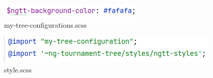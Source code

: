 \begin{figure}[H]
    \includegraphics[scale=1]{pics/frontend/my_tree_css.PNG}
    \caption{my-tree-configurations.scss}
\end{figure}

\begin{figure}[H]
    \includegraphics[scale=1]{pics/frontend/style_css.PNG}
    \caption{style.scss}
\end{figure}